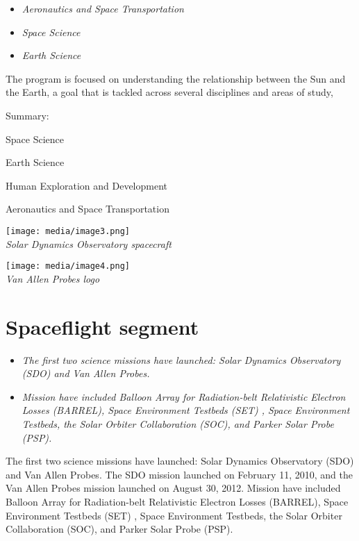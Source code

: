 \begin{itemize}
\item
  \emph{Aeronautics and Space Transportation}
\item
  \emph{Space Science}
\item
  \emph{Earth Science}
\end{itemize}

The program is focused on understanding the relationship between the Sun
and the Earth, a goal that is tackled across several disciplines and
areas of study,

Summary:

Space Science

Earth Science

Human Exploration and Development

Aeronautics and Space Transportation

\texttt{[image: media/image3.png]}\\
\emph{Solar Dynamics Observatory spacecraft}

\texttt{[image: media/image4.png]}\\
\emph{Van Allen Probes logo}

\section{Spaceflight segment}\label{spaceflight-segment}

\begin{itemize}
\item
  \emph{The first two science missions have launched: Solar Dynamics
  Observatory (SDO) and Van Allen Probes.}
\item
  \emph{Mission have included Balloon Array for Radiation-belt
  Relativistic Electron Losses (BARREL), Space Environment Testbeds
  (SET) , Space Environment Testbeds, the Solar Orbiter Collaboration
  (SOC), and Parker Solar Probe (PSP).}
\end{itemize}

The first two science missions have launched: Solar Dynamics Observatory
(SDO) and Van Allen Probes. The SDO mission launched on February 11,
2010, and the Van Allen Probes mission launched on August 30, 2012.
Mission have included Balloon Array for Radiation-belt Relativistic
Electron Losses (BARREL), Space Environment Testbeds (SET) , Space
Environment Testbeds, the Solar Orbiter Collaboration (SOC), and Parker
Solar Probe (PSP).

